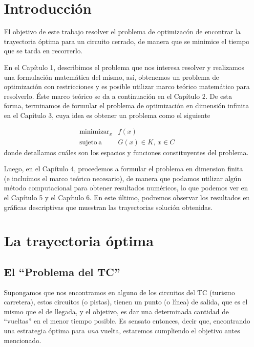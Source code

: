 \documentclass[a4paper,10pt]{book}
\begin{document}
\chapter*{Introducción}

El objetivo de este trabajo resolver el problema de optimizacón de encontrar la trayectoria óptima para un circuito cerrado, de manera que se minimice el tiempo que se tarda en recorrerlo.

En el Capítulo 1, describimos el problema que nos interesa resolver y realizamos una formulación matemática del mismo, así, obtenemos un problema de optimización con restricciones y es posible utilizar marco teórico matemático para resolverlo. Éste marco teórico se da a continuación en el Capítulo 2. De esta forma, terminamos de formular el problema de optimización en dimensión infinita en el Capítulo 3, cuya idea es obtener un problema como el siguiente

\begin{equation*}
\begin{array}{rl}
\displaystyle \mathop{\mathrm{minimizar}}_{x} & \displaystyle f(x) \\
\mathrm{sujeto \ a} & G(x)\in K,\, x\in C
\end{array}
\end{equation*}
donde detallamos cuáles son los espacios y funciones constituyentes del problema.




Luego, en el Capítulo 4, procedemos a formular el problema en dimension finita (e incluímos el marco teórico necesario), de manera que podamos utilizar algún método computacional para obtener resultados numéricos, lo que podemos ver en el Capítulo 5 y el Capítulo 6. En este último, podremos observar los resultados en gráficas descriptivas que muestran las trayectorias solución obtenidas.



\chapter{La trayectoria óptima}

\section{El ``Problema del TC''}
Supongamos que nos encontramos en alguno de los circuitos del TC (turismo carretera), estos circuitos (o pistas), tienen un punto (o línea) de salida, que es el mismo que el de llegada, y el objetivo, es dar una determinada cantidad de ``vueltas'' en el menor tiempo posible. Es sensato entonces, decir que, encontrando una estrategia óptima para \emph{una} vuelta, estaremos cumpliendo el objetivo antes mencionado.
\end{document}
